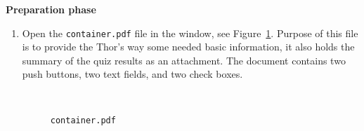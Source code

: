 \documentclass{article}
\begin{document}
\newtopic\noindent\textbf{Preparation phase}\vspace{-6pt}\relax
\begin{enumerate}
  \item Open the \texttt{container.pdf} file in the  window,
      see Figure~\ref{cap:container}. Purpose of this file is to provide
      the \textsf{Thor's way} some needed basic information, it also holds
      the summary of the quiz results as an attachment. The document contains
      two push buttons, two text fields, and two check boxes.

\begin{figure}[tbh]\centering\setlength\fboxsep{0pt}
\\
\caption{\texttt{container.pdf}}\label{cap:container}
\end{figure}


\end{enumerate}
\end{document}
